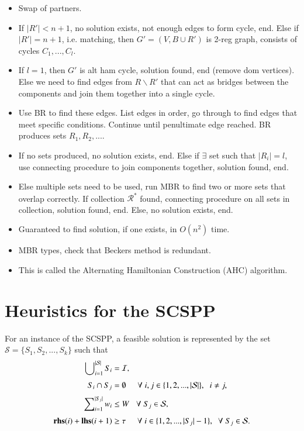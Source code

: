\documentclass{elsarticle}
\begin{document}
{\begin{itemize}
	\item Swap of partners.
	\item If $|R'| < n+1$, no solution exists, not enough edges to form cycle, end. Else if $|R'| = n+1$, i.e. matching, then $G' = (V, B \cup R')$ is 2-reg graph, consists of cycles $C_1,...,C_l$.
	\item If $l = 1$, then $G'$ is alt ham cycle, solution found, end (remove dom vertices). Else we need to find edges from $R\backslash R'$ that can act as bridges between the components and join them together into a single cycle. 
	\item Use BR to find these edges. List edges in order, go through to find edges that meet specific conditions. Continue until penultimate edge reached. BR produces sets $R_1, R_2,...$.
	\item If no sets produced, no solution exists, end. Else if $\exists$ set such that $|R_i| = l$, use connecting procedure to join components together, solution found, end.
	\item Else multiple sets need to be used, run MBR to find two or more sets that overlap correctly. If collection $\mathcal{R}^*$ found, connecting procedure on all sets in collection, solution found, end. Else, no solution exists, end.
	\item Guaranteed to find solution, if one exists, in $O(n^2)$ time.
	\item MBR types, check that Beckers method is redundant.
	\item This is called the Alternating Hamiltonian Construction (AHC) algorithm.
\end{itemize}
}

\section{Heuristics for the SCSPP}
\label{sec:scspp}
For an instance of the SCSPP, a feasible solution is represented by the set $\mathcal{S} = \{S_1, S_2, ..., S_k\}$ such that
\begin{subequations}
	\begin{align}
	\bigcup\nolimits_{i=1}^{|\mathcal{S}|} S_i &= \mathcal{I}, \label{eqn:packall}\\[3pt]
	S_i \cap S_j &= \emptyset \hspace{5mm} \forall \hspace{1mm} i, j \in \{1, 2, ..., |\mathcal{S}|\}, \hspace{2mm} i \neq j, \label{eqn:nooverlap} \\[3pt]
	\sum\nolimits_{i=1}^{|S_j|}w_i & \leq W \hspace{3mm} \forall \hspace{1mm} S_j \in \mathcal{S}, \label{eqn:capacity} \\[3pt]
	\textup{\textbf{rhs}}(i) + \textup{\textbf{lhs}}(i+1) &\geq \tau \hspace {5mm} \forall \hspace{1mm} i \in \{1, 2, ..., |S_j|-1\}, \hspace{2mm} \forall \hspace{1mm} S_j \in \mathcal{S}. \label{eqn:vscstrip}
	\end{align}
\end{subequations}
\end{document}
